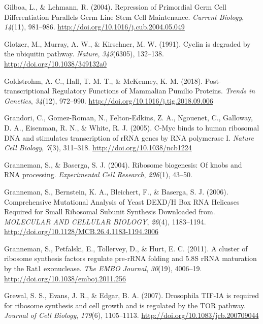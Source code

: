 \documentclass[12pt,oneside]{reedthesis}
\newlength{\cslhangindent}
\newenvironment{cslreferences}%
  {\setlength{\parindent}{0pt}%
  \everypar{\setlength{\hangindent}{\cslhangindent}}\ignorespaces}%
  {\par}
\begin{document}
\begin{cslreferences}
\leavevmode\hypertarget{ref-Gilboa2004a}{}%
Gilboa, L., \& Lehmann, R. (2004). Repression of Primordial Germ Cell Differentiation Parallels Germ Line Stem Cell Maintenance. \emph{Current Biology}, \emph{14}(11), 981--986. \url{http://doi.org/10.1016/j.cub.2004.05.049}

\leavevmode\hypertarget{ref-glotzerCyclinDegradedUbiquitin1991}{}%
Glotzer, M., Murray, A. W., \& Kirschner, M. W. (1991). Cyclin is degraded by the ubiquitin pathway. \emph{Nature}, \emph{349}(6305), 132--138. \url{http://doi.org/10.1038/349132a0}

\leavevmode\hypertarget{ref-Goldstrohm2018c}{}%
Goldstrohm, A. C., Hall, T. M. T., \& McKenney, K. M. (2018). Post-transcriptional Regulatory Functions of Mammalian Pumilio Proteins. \emph{Trends in Genetics}, \emph{34}(12), 972--990. \url{http://doi.org/10.1016/j.tig.2018.09.006}

\leavevmode\hypertarget{ref-grandoriCMycBindsHuman2005}{}%
Grandori, C., Gomez-Roman, N., Felton-Edkins, Z. A., Ngouenet, C., Galloway, D. A., Eisenman, R. N., \& White, R. J. (2005). C-Myc binds to human ribosomal DNA and stimulates transcription of rRNA genes by RNA polymerase I. \emph{Nature Cell Biology}, \emph{7}(3), 311--318. \url{http://doi.org/10.1038/ncb1224}

\leavevmode\hypertarget{ref-Granneman2004a}{}%
Granneman, S., \& Baserga, S. J. (2004). Ribosome biogenesis: Of knobs and RNA processing. \emph{Experimental Cell Research}, \emph{296}(1), 43--50.

\leavevmode\hypertarget{ref-Granneman2006}{}%
Granneman, S., Bernstein, K. A., Bleichert, F., \& Baserga, S. J. (2006). Comprehensive Mutational Analysis of Yeast DEXD/H Box RNA Helicases Required for Small Ribosomal Subunit Synthesis Downloaded from. \emph{MOLECULAR AND CELLULAR BIOLOGY}, \emph{26}(4), 1183--1194. \url{http://doi.org/10.1128/MCB.26.4.1183-1194.2006}

\leavevmode\hypertarget{ref-Granneman2011}{}%
Granneman, S., Petfalski, E., Tollervey, D., \& Hurt, E. C. (2011). A cluster of ribosome synthesis factors regulate pre-rRNA folding and 5.8S rRNA maturation by the Rat1 exonuclease. \emph{The EMBO Journal}, \emph{30}(19), 4006--19. \url{http://doi.org/10.1038/emboj.2011.256}

\leavevmode\hypertarget{ref-Grewal2007c}{}%
Grewal, S. S., Evans, J. R., \& Edgar, B. A. (2007). Drosophila TIF-IA is required for ribosome synthesis and cell growth and is regulated by the TOR pathway. \emph{Journal of Cell Biology}, \emph{179}(6), 1105--1113. \url{http://doi.org/10.1083/jcb.200709044}


\end{cslreferences}
\end{document}

